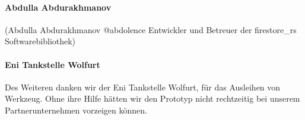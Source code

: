 \paragraph*{Abdulla Abdurakhmanov }(Abdulla Abdurakhmanov @abdolence Entwickler und Betreuer der firestore\_rs Softwarebibliothek) 
\paragraph*{Eni Tankstelle Wolfurt}Des Weiteren danken wir der Eni Tankstelle Wolfurt, für das Ausleihen von Werkzeug. Ohne ihre Hilfe hätten wir den Prototyp nicht rechtzeitig bei unserem Partnerunternehmen vorzeigen können.
